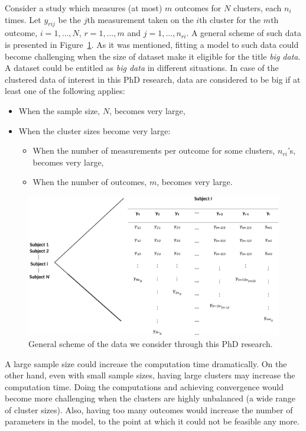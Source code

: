 \documentclass[14pt]{article}
\begin{document}
Consider a study which measures (at most) $m$ outcomes for $N$ clusters, each $n_i$ times. Let $y_{rij}$ be the $j$th measurement taken on the $i$th cluster for the $m$th outcome, $i=1,\ldots,N$, $r=1,\ldots,m$ and $j=1,\ldots,n_{ri}$. A general scheme of such data is presented in Figure~\ref{fig_scheme}. As it was mentioned, fitting a model to such data could become challenging when the size of dataset make it eligible for the title \emph{big data}. A dataset could be entitled as \emph{big data} in different situations. In case of the clustered data of interest in this PhD research, data are considered to be big if at least one of the following applies:
\begin{itemize}
\item When the sample size, $N$, becomes very large,
\item When the cluster sizes become very large:
\begin{itemize}
\item When the number of measurements per outcome for some clusters, $n_{ri}$'s, becomes very large,
\item When the number of outcomes, $m$, becomes very large.
\end{itemize}
\end{itemize}
\begin{figure}
\centering
\includegraphics[width=\textwidth]{scheme_new.eps}
\caption{General scheme of the data we consider through this PhD research.} 
\label{fig_scheme}
\end{figure} 
A large sample size could increase the computation time dramatically. On the other hand, even with small sample sizes, having large clusters may increase the computation time. Doing the computations and achieving convergence would become more challenging when the clusters are highly unbalanced (a wide range of cluster sizes). Also, having too many outcomes would increase the number of parameters in the model, to the point at which it could not be feasible any more.  
\end{document}
